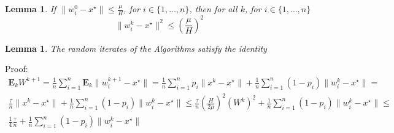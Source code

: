 \documentclass{article}
\newtheorem{lemma}[theorem]{Lemma}
\begin{document}
\begin{lemma}
If $\|w_i^0 - x^\star\| \leq \frac{\mu}{H}$, for $i \in \{1, \dots, n\}$, then for all $k$, for $i \in \{1, \dots, n\}$
\begin{equation}
    \|w_i^k - x^\star\|^2 \leq \left(\frac{\mu}{H}\right)^2
\end{equation}
\end{lemma}

\begin{lemma} The random iterates of the Algorithms satisfy the identity
\end{lemma}
Proof:
\begin{equation*}
\begin{split}
    \mathbf{E}_k W^{k + 1} = \frac{1}{n}\sum\limits_{i=1}^{n}\mathbf{E}_k\|w_i^{k + 1} - x^\star\| =
     \frac{1}{n}\sum\limits_{i=1}^{n}p_i\|x^k - x^\star\| + \frac{1}{n}\sum\limits_{i=1}^{n}(1 - p_i)\|w_i^k - x^\star\| = \\
     \frac{\tau}{n}\|x^k - x^\star\| + \frac{1}{n}\sum\limits_{i=1}^{n}(1 - p_i)\|w_i^k - x^\star\| \leq
     \frac{\tau}{n}\left(\frac{H}{2\mu}\right)^2\left(W^k\right)^2 + \frac{1}{n}\sum\limits_{i=1}^{n}(1 - p_i)\|w_i^k - x^\star\| \leq \\
     \frac{1}{4}\frac{\tau}{n} + \frac{1}{n}\sum\limits_{i=1}^{n}(1 - p_i)\|w_i^k - x^\star\|
\end{split}
\end{equation*}

\newpage
{}

\printbibliography
\end{document}
